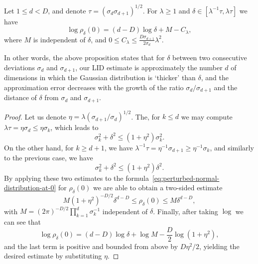 \begin{proposition}
    \label{prop:delta-gaussian-dimensions}
    Let $1 \leq d < D$, and denote $\tau = (\sigma_d\sigma_{d+1})^{1/2}$. For $\lambda \geq 1$ and $\delta\in [\lambda^{-1}\tau, \lambda\tau]$ we have
    \begin{equation}
        \log\rho_\delta(0) = (d-D)\log\delta + M - C_\lambda,
    \end{equation}
    where $M$ is independent of $\delta$, and  $0 \leq C_\lambda \leq \frac{D\sigma_{d+1}}{2\sigma_d} \lambda^2$.
\end{proposition}
In other words, the above proposition states that for $\delta$ between two consecutive deviations $\sigma_d$ and $\sigma_{d+1}$, our LID estimate is approximately the number $d$ of dimensions in which the Gaussian distribution is `thicker' than $\delta$, and the approximation error decreases with the growth of the ratio $\sigma_d/\sigma_{d+1}$ and the distance of $\delta$ from $\sigma_d$ and $\sigma_{d+1}$.

\begin{proof}
    Let us denote $\eta = \lambda(\sigma_{d+1}/\sigma_d)^{1/2}$. The, for $k\leq d$ we may compute $\lambda\tau = \eta\sigma_d \leq \eta\sigma_k$, which leads to 
    \begin{equation}
        \sigma_k^2 + \delta^2
        \leq  (1 + \eta^2)\sigma_k^2.
    \end{equation}
    On the other hand, for $k \geq d+1$, we have $\lambda^{-1}\tau = \eta^{-1}\sigma_{d+1} \geq \eta^{-1}\sigma_k$, and similarly to the previous case, we have
    \begin{equation}
        \sigma_k^2 + \delta^2
        \leq 
        (1+\eta^2)\delta^2.
    \end{equation}
    By applying these two estimates to the formula~\eqref{eq:perturbed-normal-distribution-at-0} for $\rho_\delta(0)$ we are able to obtain a two-sided estimate
    \begin{equation}
        M(1+\eta^2)^{-D/2} \delta^{d-D}
        \leq \rho_\delta(0) 
        \leq M\delta^{d-D}, 
    \end{equation}
    with $M=(2\pi)^{-D/2} \prod_{k=1}^d \sigma_k^{-1}$ independent of $\delta$. Finally, after taking $\log$ we can see that
    \begin{equation}
        \log \rho_\delta(0) = (d-D)\log\delta + \log M - \frac{D}{2}\log(1+\eta^2),
    \end{equation}
    and the last term is positive and bounded from above by $D\eta^2/2$, yielding the desired estimate by substituting $\eta$.
\end{proof}

